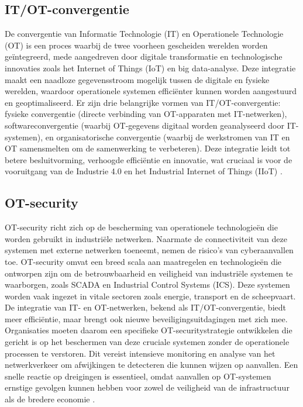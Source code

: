 \subsection{IT/OT-convergentie}
De convergentie van Informatie Technologie (IT) en Operationele Technologie (OT) is een proces waarbij de twee voorheen gescheiden werelden worden geïntegreerd, mede aangedreven door digitale 
transformatie en technologische innovaties zoals het Internet of Things (IoT) en big data-analyse. Deze integratie maakt een naadloze gegevensstroom mogelijk tussen de digitale en fysieke werelden, 
waardoor operationele systemen efficiënter kunnen worden aangestuurd en geoptimaliseerd. Er zijn drie belangrijke vormen van IT/OT-convergentie: fysieke convergentie (directe verbinding van OT-apparaten met IT-netwerken), 
softwareconvergentie (waarbij OT-gegevens digitaal worden geanalyseerd door IT-systemen), en organisatorische convergentie (waarbij de werkstromen van IT en OT samensmelten om de samenwerking te verbeteren). Deze integratie 
leidt tot betere besluitvorming, verhoogde efficiëntie en innovatie, wat cruciaal is voor de vooruitgang van de Industrie 4.0 en het Industrial Internet of Things (IIoT) \autocite{Convergentie}.

\subsection{OT-security}
OT-security richt zich op de bescherming van operationele technologieën die worden gebruikt in industriële netwerken. Naarmate de connectiviteit van deze systemen 
met externe netwerken toeneemt, nemen de risico’s van cyberaanvallen toe. OT-security omvat een breed scala aan maatregelen en technologieën die ontworpen zijn om 
de betrouwbaarheid en veiligheid van industriële systemen te waarborgen, zoals SCADA en Industrial Control Systems (ICS). Deze systemen worden vaak ingezet in vitale 
sectoren zoals energie, transport en de scheepvaart. De integratie van IT- en OT-netwerken, bekend als IT/OT-convergentie, biedt meer efficiëntie, maar brengt ook nieuwe 
beveiligingsuitdagingen met zich mee. Organisaties moeten daarom een specifieke OT-securitystrategie ontwikkelen die gericht is op het beschermen van deze cruciale systemen 
zonder de operationele processen te verstoren. Dit vereist intensieve monitoring en analyse van het netwerkverkeer om afwijkingen te detecteren die kunnen wijzen op aanvallen. 
Een snelle reactie op dreigingen is essentieel, omdat aanvallen op OT-systemen ernstige gevolgen kunnen hebben voor zowel de veiligheid van de infrastructuur als de bredere economie \autocite{Nomios2024}.


